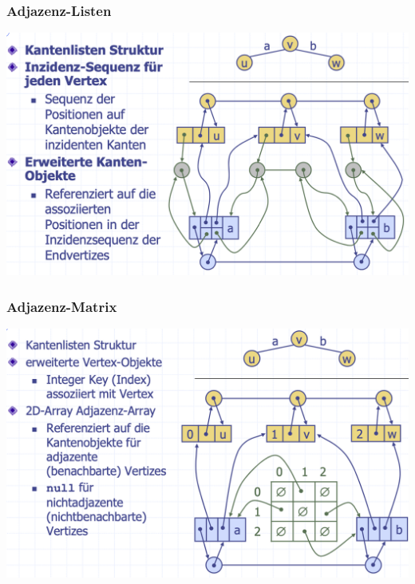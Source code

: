 \subsubsection{Adjazenz-Listen}
\begin{center}
    \includegraphics[scale=.23]{graphic/11 Graph/Adjazenz-Listen.png}
\end{center}
\vspace{-8pt}


\subsubsection{Adjazenz-Matrix}
\begin{center}
    \includegraphics[scale=.23]{graphic/11 Graph/Adjazenz-Matrix.png}
\end{center}
\vspace{-8pt}


